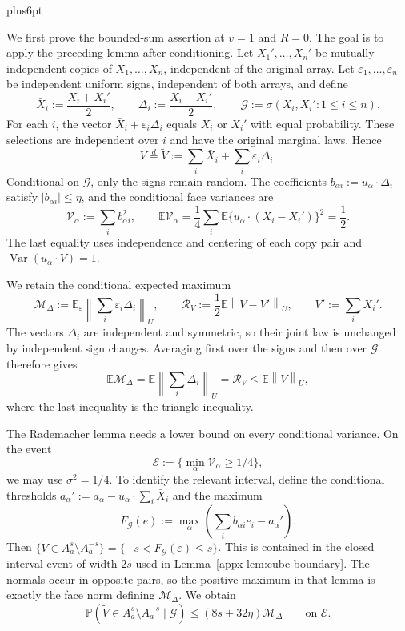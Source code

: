 \documentclass[11pt,letterpaper,twoside,leqno]{article}
\makeatletter
\theoremstyle{bookplain}
\theoremstyle{bookremark}
\renewenvironment{proof}[1][\proofname]{\par
  \pushQED{\qed}\normalfont\topsep6pt plus6pt\relax
  \trivlist\item[\hskip\labelsep\bfseries #1\@addpunct{.}]\ignorespaces
}{\popQED\endtrivlist\@endpefalse}
\newcommand{\E}{\mathbb E}
\newcommand{\Pp}{\mathbb P}
\newcommand{\Var}{\operatorname{Var}}
\newcommand{\norm}[1]{\left\lVert#1\right\rVert}
\makeatother
\begin{document}
\begin{proof}[Proof of Lemma~\ref{lem:concentration}]
We first prove the bounded-sum assertion at $v=1$ and $R=0$.
The goal is to apply the preceding lemma after conditioning.
Let $X_1',\ldots,X_n'$ be mutually independent copies of
$X_1,\ldots,X_n$, independent of the original array. Let
$\varepsilon_1,\ldots,\varepsilon_n$ be independent uniform signs,
independent of both arrays, and define
\[
 \bar X_i:=\frac{X_i+X_i'}2,\qquad
 \Delta_i:=\frac{X_i-X_i'}2,\qquad
 \mathcal G:=\sigma(X_i,X_i':1\le i\le n).
\]
For each $i$, the vector $\bar X_i+\varepsilon_i\Delta_i$ equals
$X_i$ or $X_i'$ with equal probability. These selections are
independent over $i$ and have the original marginal laws. Hence
\begin{equation}
 V\stackrel d=\widetilde V:=\sum_i\bar X_i+\sum_i\varepsilon_i\Delta_i.
 \label{appx-eq:pair-representation}
\end{equation}
Conditional on $\mathcal G$, only the signs remain random.
The coefficients $b_{\alpha i}:=u_\alpha\cdot\Delta_i$ satisfy
$|b_{\alpha i}|\le\eta$, and the conditional face variances are
\[
 \mathcal V_\alpha:=\sum_i b_{\alpha i}^2,\qquad
 \E\mathcal V_\alpha
 =\frac14\sum_i\E\{u_\alpha\cdot(X_i-X_i')\}^2
 =\frac12.
\]
The last equality uses independence and centering of each copy pair
and $\Var(u_\alpha\cdot V)=1$.

We retain the conditional expected maximum
\[
 \mathcal M_\Delta:=\E_\varepsilon
       \norm{\sum_i\varepsilon_i\Delta_i}_U,
 \qquad
 \mathcal R_V:=\frac12\E\norm{V-V'}_U,\qquad V':=\sum_iX_i'.
\]
The vectors $\Delta_i$ are independent and symmetric, so their
joint law is unchanged by independent sign changes. Averaging first
over the signs and then over $\mathcal G$ therefore gives
\[
 \E\mathcal M_\Delta
 =\E\norm{\sum_i\Delta_i}_U=\mathcal R_V
 \le\E\norm V_U,
\]
where the last inequality is the triangle inequality.

The Rademacher lemma needs a lower bound on every conditional
variance. On the event
\[
 \mathcal E:=\{\min_\alpha\mathcal V_\alpha\ge1/4\},
\]
we may use $\sigma^2=1/4$. To identify the relevant interval,
define the conditional thresholds
$a_\alpha':=a_\alpha-u_\alpha\cdot\sum_i\bar X_i$ and the maximum
\[
 F_{\mathcal G}(e):=
       \max_\alpha\left(\sum_i b_{\alpha i}e_i-a_\alpha'\right).
\]
Then
$\{\widetilde V\in A_a^s\setminus A_a^{-s}\}
=\{-s<F_{\mathcal G}(\varepsilon)\le s\}$.
This is contained in the closed interval event of width $2s$
used in Lemma~\ref{appx-lem:cube-boundary}.
The normals occur in opposite pairs, so the positive maximum in
that lemma is exactly the face norm defining $\mathcal M_\Delta$.
We obtain
\begin{equation}
 \Pp(\widetilde V\in A_a^s\setminus A_a^{-s}\mid\mathcal G)
 \le(8s+32\eta)\mathcal M_\Delta
 \qquad\text{on }\mathcal E.
 \label{appx-eq:conditional-intrinsic-concentration}
\end{equation}


\end{proof}
\end{document}
